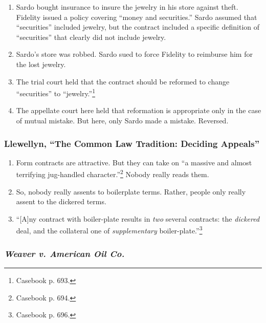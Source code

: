 \begin{enumerate}
    \item Sardo bought insurance to insure the jewelry in his store against 
    theft. Fidelity issued a policy covering ``money and securities.'' Sardo 
    assumed that ``securities'' included jewelry, but the contract included a 
    specific definition of ``securities'' that clearly did not include 
    jewelry.
    \item Sardo's store was robbed. Sardo sued to force Fidelity to reimburse 
    him for the lost jewelry.
    \item The trial court held that the contract should be reformed to change 
    ``securities'' to ``jewelry.''\footnote{Casebook p. 693.}
    \item The appellate court here held that reformation is appropriate only 
    in the case of mutual mistake. But here, only Sardo made a mistake. 
    Reversed.
\end{enumerate}

\subsubsection{Llewellyn, ``The Common Law Tradition: Deciding Appeals''}

\begin{enumerate}
    \item Form contracts are attractive. But they can take on ``a massive and 
    almost terrifying jug-handled character.''\footnote{Casebook p. 694.} 
    Nobody really reads them.
    \item So, nobody really assents to boilerplate terms. Rather, people only 
    really assent to the dickered terms.
    \item ``[A]ny contract with boiler-plate results in \emph{two} several 
    contracts: the \emph{dickered} deal, and the collateral one of 
    \emph{supplementary} boiler-plate.''\footnote{Casebook p. 696.}
\end{enumerate}

\subsubsection{\emph{Weaver v. American Oil Co.}}

